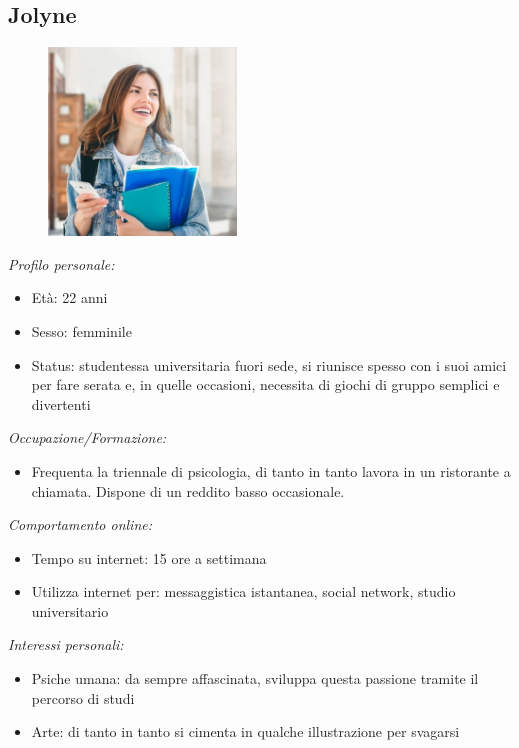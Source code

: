 \subsection{Jolyne}
\begin{figure}[H]
    \centering
    \includegraphics[width=50mm]{img/personas/jolyne.jpg}
    \label{fig:personas_jolyne}
\end{figure}
\textit{Profilo personale:}
\begin{itemize}
    \item Età: 22 anni
    \item Sesso: femminile
    \item Status: studentessa universitaria fuori sede, si riunisce spesso con i suoi amici per fare serata e, in quelle occasioni, necessita di giochi di gruppo semplici e divertenti
\end{itemize}
\textit{Occupazione/Formazione:}
\begin{itemize}
    \item Frequenta la triennale di psicologia, di tanto in tanto lavora in un ristorante a chiamata. Dispone di un reddito basso occasionale.
\end{itemize}
\textit{Comportamento online:}
\begin{itemize}
    \item Tempo su internet: 15 ore a settimana
    \item Utilizza internet per: messaggistica istantanea, social network, studio universitario
\end{itemize}
\textit{Interessi personali:}
\begin{itemize}
    \item Psiche umana: da sempre affascinata, sviluppa questa passione tramite il percorso di studi
    \item Arte: di tanto in tanto si cimenta in qualche illustrazione per svagarsi 
\end{itemize}

